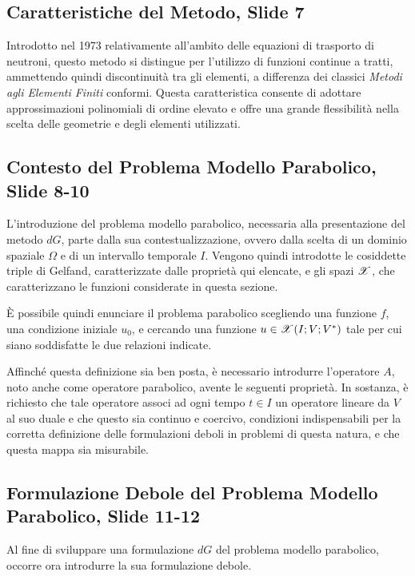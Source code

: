 \documentclass[12pt]{article}
\begin{document}
    \subsection{Caratteristiche del Metodo, Slide 7}

    Introdotto nel 1973 relativamente all'ambito delle equazioni di trasporto di neutroni, questo metodo si distingue per l'utilizzo di funzioni continue a tratti, ammettendo quindi discontinuità tra gli elementi, a differenza dei classici \textit{Metodi agli Elementi Finiti} conformi. Questa caratteristica consente di adottare approssimazioni polinomiali di ordine elevato e offre una grande flessibilità nella scelta delle geometrie e degli elementi utilizzati.

    \subsection{Contesto del Problema Modello Parabolico, Slide 8-10}

    L'introduzione del problema modello parabolico, necessaria alla presentazione del metodo $dG$, parte dalla sua contestualizzazione, ovvero dalla scelta di un dominio spaziale $\Omega$ e di un intervallo temporale $I$. Vengono quindi introdotte le cosiddette triple di Gelfand, caratterizzate dalle proprietà qui elencate, e gli spazi $\mathscr{X}$, che caratterizzano le funzioni considerate in questa sezione.

    È possibile quindi enunciare il problema parabolico scegliendo una funzione $f$, una condizione iniziale $u_0$, e cercando una funzione $u \in \mathscr{X}(I; V; V^*)$ tale per cui siano soddisfatte le due relazioni indicate.

    Affinché questa definizione sia ben posta, è necessario introdurre l'operatore $A$, noto anche come operatore parabolico, avente le seguenti proprietà. In sostanza, è richiesto che tale operatore associ ad ogni tempo $t \in I$ un operatore lineare da $V$ al suo duale e che questo sia continuo e coercivo, condizioni indispensabili per la corretta definizione delle formulazioni deboli in problemi di questa natura, e che questa mappa sia misurabile.

    \subsection{Formulazione Debole del Problema Modello Parabolico, Slide 11-12}

    Al fine di sviluppare una formulazione $dG$ del problema modello parabolico, occorre ora introdurre la sua formulazione debole.
\end{document}
